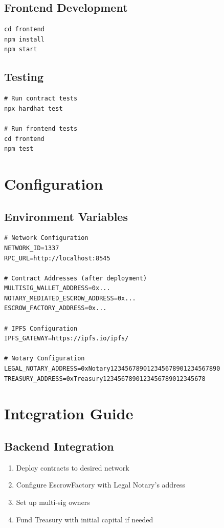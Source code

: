 \documentclass[12pt,a4paper]{article}
\begin{document}
\subsection{Frontend Development}
\begin{verbatim}
cd frontend
npm install
npm start
\end{verbatim}

\subsection{Testing}
\begin{verbatim}
# Run contract tests
npx hardhat test

# Run frontend tests
cd frontend
npm test
\end{verbatim}

\section{Configuration}

\subsection{Environment Variables}
\begin{verbatim}
# Network Configuration
NETWORK_ID=1337
RPC_URL=http://localhost:8545

# Contract Addresses (after deployment)
MULTISIG_WALLET_ADDRESS=0x...
NOTARY_MEDIATED_ESCROW_ADDRESS=0x...
ESCROW_FACTORY_ADDRESS=0x...

# IPFS Configuration
IPFS_GATEWAY=https://ipfs.io/ipfs/

# Notary Configuration
LEGAL_NOTARY_ADDRESS=0xNotary123456789012345678901234567890
TREASURY_ADDRESS=0xTreasury1234567890123456789012345678
\end{verbatim}

\section{Integration Guide}

\subsection{Backend Integration}
\begin{enumerate}
\item Deploy contracts to desired network
\item Configure EscrowFactory with Legal Notary's address
\item Set up multi-sig owners
\item Fund Treasury with initial capital if needed
\end{enumerate}
\end{document}
